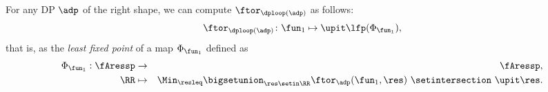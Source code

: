 \begin{theorem}
    \label{prop:loop-continuous}
    For any DP $\adp$ of the right shape, we can compute $ \ftor_{\dploop(\adp)}$
    as follows:
    \begin{equation}\label{eq:loop_fixpoint1}
        \ftor_{\dploop(\adp)}\colon\fun_{1}\mapsto\upit\lfp(\Phi_{\fun_{1}}),
    \end{equation}
    that is, as the \emph{least fixed point} of a map $\Phi_{\fun_{1}}$ defined as
    \begin{eqnarray}
        \Phi_{\fun_{1}}:\fAressp & \to     & \fAressp,\label{eq:bigphi1} \\
        \RR                      & \mapsto & \Min_{\resleq}\bigsetunion_{\res\setin\RR}\ftor_{\adp}(\fun_{1}, \res)\ \setintersection\ \upit\res.
        \nonumber
    \end{eqnarray}
\end{theorem}
